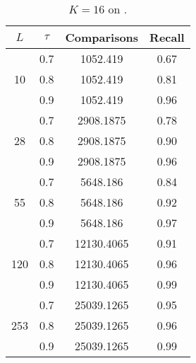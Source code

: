 \documentclass[11pt]{article}
\begin{document}
\begin{table}
\centering
\begin{tabular}{|c|c|c|c|}
\hline
$L$ & $\tau$ & Comparisons & Recall \\ 
\hline
\multirow{3}{*}{10} & 0.7 & 1052.419 & 0.67 \\
& 0.8 & 1052.419 & 0.81 \\
& 0.9 & 1052.419 & 0.96 \\
\hline
\multirow{3}{*}{28} & 0.7 & 2908.1875 & 0.78 \\
& 0.8 & 2908.1875 & 0.90 \\
& 0.9 & 2908.1875 & 0.96 \\
\hline
\multirow{3}{*}{55} & 0.7 & 5648.186 & 0.84 \\
& 0.8 & 5648.186 & 0.92 \\
& 0.9 & 5648.186 & 0.97 \\
\hline
\multirow{3}{*}{120} & 0.7 & 12130.4065 & 0.91 \\
& 0.8 & 12130.4065 & 0.96 \\
& 0.9 & 12130.4065 & 0.99 \\
\hline
\multirow{3}{*}{253} & 0.7 & 25039.1265 & 0.95 \\
& 0.8 & 25039.1265 & 0.96 \\
& 0.9 & 25039.1265 & 0.99 \\
\hline 
 \end{tabular}
\caption{\footnotesize{$K=16$ on \dataA.}}
\label{tab:data-so}
\end{table}
\end{document}
